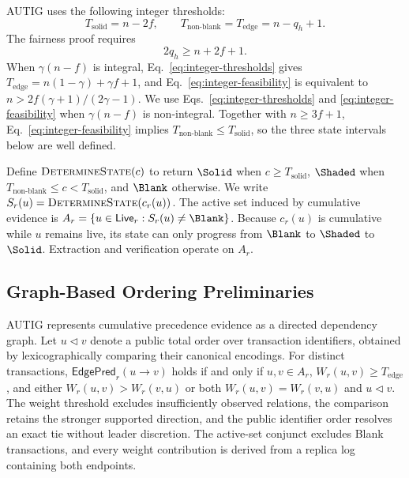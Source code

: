 AUTIG uses the following integer thresholds:
\begin{equation}
 T_{\mathrm{solid}}=n-2f,
 \qquad
 T_{\mathrm{non\mbox{-}blank}}=T_{\mathrm{edge}}
   =n-q_h+1.
 \label{eq:integer-thresholds}
\end{equation}
The fairness proof requires
\begin{equation}
 2q_h\ge n+2f+1.
 \label{eq:integer-feasibility}
\end{equation}
When $\gamma(n-f)$ is integral, Eq.~\eqref{eq:integer-thresholds} gives $T_{\mathrm{edge}}=n(1-\gamma)+\gamma f+1$, and
Eq.~\eqref{eq:integer-feasibility} is equivalent to $n>2f(\gamma+1)/(2\gamma-1)$.
We use Eqs.~\eqref{eq:integer-thresholds} and \eqref{eq:integer-feasibility} when $\gamma(n-f)$ is non-integral. Together with $n\ge3f+1$, Eq.~\eqref{eq:integer-feasibility} implies $T_{\mathrm{non\mbox{-}blank}}\le T_{\mathrm{solid}}$, so the three state intervals below are well defined.

Define $\textsc{DetermineState}(c)$ to return $\Solid$ when
$c\ge T_{\mathrm{solid}}$, $\Shaded$ when $T_{\mathrm{non\mbox{-}blank}}\le c<T_{\mathrm{solid}}$, and $\Blank$ otherwise. We write $S_r(u)=\textsc{DetermineState}(c_r(u))$.  The active set induced by cumulative evidence is
$A_r=\{u\in\mathsf{Live}_r:S_r(u)\ne\Blank\}$. Because $c_r(u)$ is cumulative while $u$ remains live, its state can only progress from $\Blank$ to $\Shaded$ to $\Solid$. Extraction and verification operate on $A_r$.

\subsection{Graph-Based Ordering Preliminaries}
\label{sec:graph-preliminaries}

AUTIG represents cumulative precedence evidence as a directed dependency graph. Let $u\triangleleft v$ denote a public total order over transaction identifiers, obtained by lexicographically comparing their canonical encodings.
For distinct transactions, $\mathsf{EdgePred}_r(u\to v)$ holds if and only if $u,v\in A_r$, $W_r(u,v)\ge T_{\mathrm{edge}}$, and either $W_r(u,v)>W_r(v,u)$ or both $W_r(u,v)=W_r(v,u)$ and $u\triangleleft v$.
The weight threshold excludes insufficiently observed relations, the comparison retains the stronger supported direction, and the public identifier order resolves an exact tie without leader discretion.  The active-set conjunct excludes Blank transactions, and every weight contribution is derived from a replica log containing both endpoints.

